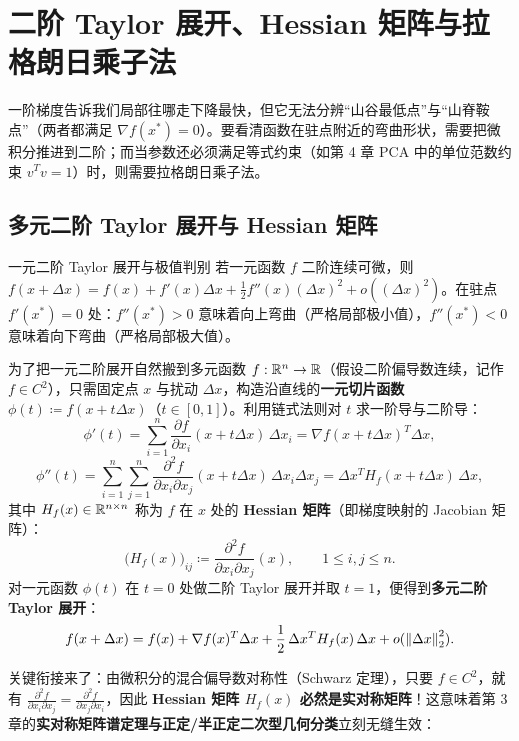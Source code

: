 \section{二阶 Taylor 展开、Hessian 矩阵与拉格朗日乘子法}
\label{sec:ch5-hessian-lagrange}

一阶梯度告诉我们局部往哪走下降最快，但它无法分辨“山谷最低点”与“山脊鞍点”（两者都满足 $\nabla f(x^*) = 0$）。要看清函数在驻点附近的弯曲形状，需要把微积分推进到二阶；而当参数还必须满足等式约束（如第 4 章 PCA 中的单位范数约束 $v^T v = 1$）时，则需要拉格朗日乘子法。

\subsection{多元二阶 Taylor 展开与 Hessian 矩阵}

\begin{recallBox}{一元二阶 Taylor 展开与极值判别}
若一元函数 $f$ 二阶连续可微，则 $f(x+\Delta x) = f(x) + f'(x)\Delta x + \frac{1}{2}f''(x)(\Delta x)^2 + o((\Delta x)^2)$。在驻点 $f'(x^*)=0$ 处：$f''(x^*)>0$ 意味着向上弯曲（严格局部极小值），$f''(x^*)<0$ 意味着向下弯曲（严格局部极大值）。
\end{recallBox}

为了把一元二阶展开自然搬到多元函数 $f:\mathbb{R}^n\to\mathbb{R}$（假设二阶偏导数连续，记作 $f\in C^2$），只需固定点 $x$ 与扰动 $\Delta x$，构造沿直线的\textbf{一元切片函数} $\phi(t) \coloneqq f(x + t\Delta x)$（$t\in[0,1]$）。利用链式法则对 $t$ 求一阶导与二阶导：
\[
  \phi'(t) = \sum_{i=1}^n \frac{\partial f}{\partial x_i}(x + t\Delta x)\,\Delta x_i
           = \nabla f(x+t\Delta x)^T \Delta x,
\]
\[
  \phi''(t) = \sum_{i=1}^n \sum_{j=1}^n \frac{\partial^2 f}{\partial x_i \partial x_j}(x + t\Delta x)\,\Delta x_i \Delta x_j
            = \Delta x^T H_f(x+t\Delta x)\,\Delta x,
\]
其中 $H_f(x) \in \mathbb{R}^{n\times n}$ 称为 $f$ 在 $x$ 处的 \textbf{Hessian 矩阵}（即梯度映射的 Jacobian 矩阵）：
\[
  \big(H_f(x)\big)_{ij} \coloneqq \frac{\partial^2 f}{\partial x_i \partial x_j}(x), \qquad 1 \le i,j \le n.
\]
对一元函数 $\phi(t)$ 在 $t=0$ 处做二阶 Taylor 展开并取 $t=1$，便得到\textbf{多元二阶 Taylor 展开}：
\begin{equation}\label{eq:ch5-taylor2}
  f(x + \Delta x) = f(x) + \nabla f(x)^T \Delta x + \frac{1}{2}\,\Delta x^T H_f(x)\,\Delta x + o(\left\|\Delta x\right\|_2^2).
\end{equation}

关键衔接来了：由微积分的混合偏导数对称性（Schwarz 定理），只要 $f\in C^2$，就有 $\frac{\partial^2 f}{\partial x_i \partial x_j} = \frac{\partial^2 f}{\partial x_j \partial x_i}$，因此 \textbf{Hessian 矩阵 $H_f(x)$ 必然是实对称矩阵}！这意味着第 3 章的\textbf{实对称矩阵谱定理与正定/半正定二次型几何分类}立刻无缝生效：

